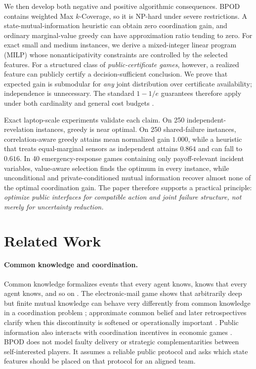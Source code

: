 We then develop both negative and positive algorithmic consequences. BPOD contains weighted Max $k$-Coverage, so it is NP-hard under severe restrictions. A state-mutual-information heuristic can obtain zero coordination gain, and ordinary marginal-value greedy can have approximation ratio tending to zero. For exact small and medium instances, we derive a mixed-integer linear program (MILP) whose nonanticipativity constraints are controlled by the selected features. For a structured class of \emph{public-certificate games}, however, a realized feature can publicly certify a decision-sufficient conclusion. We prove that expected gain is submodular for \emph{any} joint distribution over certificate availability; independence is unnecessary. The standard $1-1/e$ guarantees therefore apply under both cardinality and general cost budgets \cite{NemhauserEtAl1978,Sviridenko2004}.

Exact laptop-scale experiments validate each claim. On 250 independent-revelation instances, greedy is near optimal. On 250 shared-failure instances, correlation-aware greedy attains mean normalized gain $1.000$, while a heuristic that treats equal-marginal sensors as independent attains $0.864$ and can fall to $0.616$. In 40 emergency-response games containing only payoff-relevant incident variables, value-aware selection finds the optimum in every instance, while unconditional and private-conditioned mutual information recover almost none of the optimal coordination gain. The paper therefore supports a practical principle: \emph{optimize public interfaces for compatible action and joint failure structure, not merely for uncertainty reduction.}

\section{Related Work}

\paragraph{Common knowledge and coordination.}
Common knowledge formalizes events that every agent knows, knows that every agent knows, and so on \cite{Aumann1976,HalpernMoses1990}. The electronic-mail game shows that arbitrarily deep but finite mutual knowledge can behave very differently from common knowledge in a coordination problem \cite{Rubinstein1989}; approximate common belief and later retrospectives clarify when this discontinuity is softened or operationally important \cite{MondererSamet1989,Morris2002}. Public information also interacts with coordination incentives in economic games \cite{MorrisShin2002}. BPOD does not model faulty delivery or strategic complementarities between self-interested players. It assumes a reliable public protocol and asks which state features should be placed on that protocol for an aligned team.

